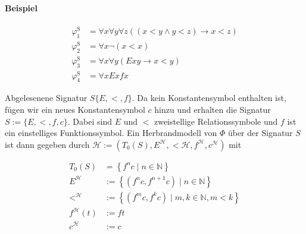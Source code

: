\documentclass[
    ngerman,
    color=3b,
    summary,
    boxarc,
    main,
    fleqn,
    leqno,
]{rubos-tuda-template}
\begin{document}
    \paragraph{Beispiel}
    \begin{ceqn}
        \begin{align*}
            \varphi_1^{\mathrm{S}} & =\forall x \forall y \forall z((x<y \wedge y<z) \rightarrow x<z) \\
            \varphi_2^{\mathrm{S}} & =\forall x \neg(x<x)                                             \\
            \varphi_3^{\mathrm{S}} & =\forall x \forall y(E x y \rightarrow x<y)                      \\
            \varphi_4^{\mathrm{S}} & =\forall x Exfx
        \end{align*}
    \end{ceqn}
    Abgelesenene Signatur $S\{E,<, f\}$.
    Da kein Konstantensymbol enthalten ist, fügen wir ein neues Konstantensymbol $c$ hinzu und erhalten die Signatur $S:=\{E,<, f, c\}$.
    Dabei sind $E$ und $<$ zweistellige Relationssymbole und $f$ ist ein einstelliges Funktionssymbol.  Ein Herbrandmodell von $\Phi$ über der Signatur $S$ ist dann gegeben durch $\mathcal{H}:=\left(T_0(S), E^{\mathcal{H}},<\mathcal{H}, f^{\mathcal{H}}, c^{\mathcal{H}}\right)$ mit
    \begin{ceqn}
        \begin{align*}
            T_0(S)             & =\left\{f^n c \mid n \in \mathbb{N}\right\}                              \\
            E^{\mathcal{H}}    & :=\left\{\left(f^n c, f^{n+1} c\right) \mid n \in \mathbb{N}\right\}     \\
            <^{\mathcal{H}}    & :=\left\{\left(f^m c, f^k c\right) \mid m, k \in \mathbb{N}, m<k\right\} \\
            f^{\mathcal{H}}(t) & :=f t                                                                    \\
            c^{\mathcal{H}}    & :=c
        \end{align*}
    \end{ceqn}
\end{document}
